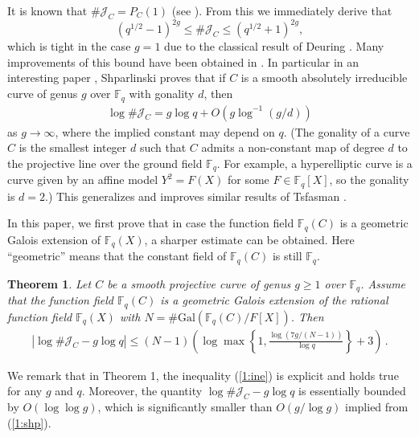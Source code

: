\documentclass[12pt]{amsart}
\theoremstyle{plain}
\newtheorem{thm}{Theorem}
\newcommand{\F}{{\mathbb F}_q}
\newcommand{\J}{\mathcal J}
\begin{document}
It is known that $\# \J_C=P_C(1)$ (see \cite[Corollary VIII.6.3]{lor}). From this we immediately derive that
\[(q^{1/2}-1)^{2g} \le \# \J_C \le (q^{1/2}+1)^{2g},\]
which is tight in the case $g=1$ due to the classical result of Deuring \cite{deu}. Many improvements of this bound have been obtained in \cite{que,rosen,shp,ste,tsf}. In particular in an interesting paper \cite{shp}, Shparlinski proves that if $C$ is a smooth absolutely irreducible curve of genus $g$ over $\F$ with gonality $d$, then
\begin{eqnarray} \label{1:shp}
\log \# \J_C= g \log q+O\left(g \log^{-1}(g/d)\right)
\end{eqnarray}
as $g \to \infty$, where the implied constant may depend on $q$. (The gonality of a curve $C$ is the smallest integer $d$ such that $C$ admits a non-constant map of degree $d$ to the projective line over the ground field $\F$. For example, a hyperelliptic curve is a curve given by an affine model $Y^2=F(X)$ for some $F \in \F[X]$, so the gonality is $d = 2$.) This generalizes and improves similar results of Tsfasman \cite{tsf}.

In this paper, we first prove that in case the function field $\F(C)$ is a geometric Galois extension of $\F(X)$, a sharper estimate can be obtained. Here ``geometric'' means that the constant field of $\F(C)$ is still $\F$. %

\begin{thm} \label{1:thm1} Let $C$ be a smooth projective curve of genus $g \ge 1$ over $\F$. Assume that the function field $\F(C)$ is a geometric Galois extension of the rational function field $\F(X)$ with $N=\#\mathrm{Gal}\left(\F(C)/F[X]\right)$. Then
\begin{eqnarray} \label{1:ine}
|\log \# \J_C- g \log q| \le \left(N-1\right)\left( \log \max \left\{1, \frac{\log(7g/(N-1))}{\log q}\right\}+3\right)\,.
\end{eqnarray}
\end{thm}

We remark that in Theorem 1, the inequality (\ref{1:ine}) is explicit and holds true for any $g$ and $q$. Moreover, the quantity $\log \# \J_C- g \log q$ is essentially bounded by $O(\log \log g)$, which is significantly smaller than $O(g/\log g)$ implied from (\ref{1:shp}).
\end{document}
